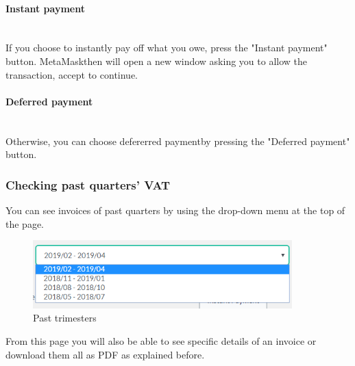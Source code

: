 			\paragraph{Instant payment} \mbox{}\\
			If you choose to instantly pay off what you owe, press the "Instant 
			payment" button. MetaMask\glosp then will open a new window asking you to allow the 
			transaction, accept to continue.
			\paragraph{Deferred payment} \mbox{}\\
			Otherwise, you can choose defererred payment\glosp by pressing the "Deferred payment" button.
%
		\subsubsection{Checking past quarters' VAT}
		You can see invoices of past quarters by using the drop-down 
		menu at the top of the page.
		\begin{figure}[H]
			\includegraphics[width=10cm]{res/images/past_trimesters.png}
			\centering
			\caption{Past trimesters}
		\end{figure}
		\noindent From this page you will also be able to see specific details 
		of an invoice or download them all as PDF as explained before.